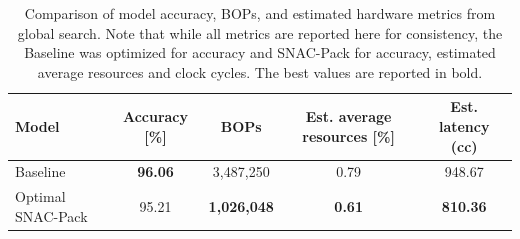 \documentclass[11pt]{article}
\begin{document}

\begin{table}[t]
  \caption{Comparison of model accuracy, BOPs, and estimated hardware metrics from global search. Note that while all metrics are reported here for consistency, the Baseline was optimized for accuracy and SNAC-Pack for accuracy, estimated average resources and clock cycles. The best values are reported in bold.}
  \label{tab:qubit-global-comparison}
  \centering
  \footnotesize
  \begin{tabular}{lcccc}
    \toprule
    Model & Accuracy [\%] & BOPs & Est. average resources [\%] & Est. latency (cc) \\
    \midrule
    Baseline \cite{} & \textbf{96.06} & 3{,}487{,}250 & 0.79 & 948.67 \\
    Optimal SNAC-Pack & 95.21 & \textbf{1{,}026{,}048} & \textbf{0.61} & \textbf{810.36} \\
    \bottomrule
  \end{tabular}
\end{table}

\begin{table}[t]
  \caption{Hardware resource utilization and latency estimates for qubit readout models synthesized with hls4ml. The baseline model uses a 400 clock cycle readout window with an 800-dimensional input. The SNAC-Pack model is synthesized after local search with combined quantization-aware training and iterative magnitude pruning. CC denotes the number of clock cycles. The best values are reported in bold.}
  \label{tab:qubit-model-comparison-synth}
  \centering
  \scriptsize
\end{table}
\end{document}
